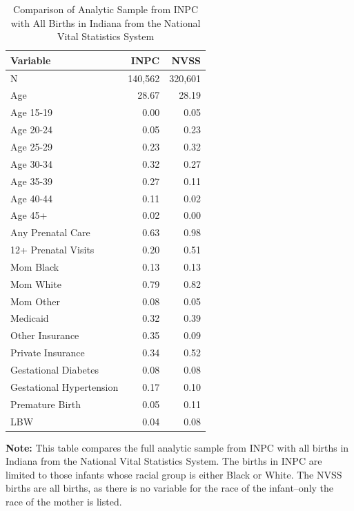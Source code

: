 \begin{table}[ht]
\centering
\caption{Comparison of Analytic Sample from INPC with All Births in Indiana from the National Vital Statistics System}
\begin{tabular}{lrr}
  \hline
Variable & INPC & NVSS \\ 
  \hline
  N & 140,562 & 320,601 \\ 
  Age   & 28.67 & 28.19 \\ 
  Age 15-19 & 0.00 & 0.05 \\ 
  Age 20-24 & 0.05 & 0.23 \\ 
  Age 25-29 & 0.23 & 0.32 \\ 
  Age 30-34 & 0.32 & 0.27 \\ 
  Age 35-39 & 0.27 & 0.11 \\ 
  Age 40-44 & 0.11 & 0.02 \\ 
  Age 45+ & 0.02 & 0.00 \\ 
  Any Prenatal Care & 0.63 & 0.98 \\ 
  12+ Prenatal Visits & 0.20 & 0.51 \\ 
  Mom Black & 0.13 & 0.13 \\ 
  Mom White & 0.79 & 0.82 \\ 
  Mom Other & 0.08 & 0.05 \\ 
  Medicaid & 0.32 & 0.39 \\ 
  Other Insurance & 0.35 & 0.09 \\ 
  Private Insurance & 0.34 & 0.52 \\ 
  Gestational Diabetes & 0.08 & 0.08 \\ 
  Gestational Hypertension & 0.17 & 0.10 \\ 
  Premature Birth & 0.05 & 0.11 \\ 
  LBW & 0.04 & 0.08 \\ 
   \hline
\end{tabular}
\parbox{\textwidth}{\smallskip \textbf{Note:}  This table compares the full analytic sample from INPC with all births in Indiana from the National Vital Statistics System. The births in INPC are limited to those infants whose racial group is either Black or White. The NVSS births are all births, as there is no variable for the race of the infant--only the race of the mother is listed.}
\end{table}